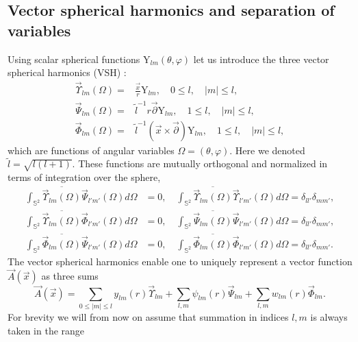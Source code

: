\documentclass[12pt]{article}
\newcommand{\pl}{\partial}
\newcommand{\Sph}{\mathbb{S}}
\newcommand{\YY}{\mathrm{Y}}
\begin{document}
\subsection{Vector spherical harmonics and separation
	    of variables}
	Using  scalar spherical functions
$ \YY_{lm}(\theta,\varphi) $
	let us introduce the three vector spherical harmonics (VSH)
\cite{VSH}:
\begin{align}
\label{VSH1}
    \vec{\Upsilon}_{lm}(\Omega) = & \frac{\vec{x}}{r} \YY_{lm} , \quad
        0 \leq l, \quad |m| \leq l, \\
    \vec{\Psi}_{lm}(\Omega) = & \tilde{l}^{-1} r \vec{\pl} \YY_{lm} , \quad
        1 \leq l , \quad |m| \leq l, \\
\label{VSH3}
    \vec{\Phi}_{lm}(\Omega)
	= & \tilde{l}^{-1} (\vec{x} \times \vec{\pl}) \YY_{lm},
        \quad 1 \leq l , \quad |m| \leq l ,
\end{align}
	which are functions of angular variables
$ \Omega = (\theta,\varphi) $.
	Here we denoted
$ \tilde{l} = \sqrt{l(l+1)} $.
	These functions are mutually orthogonal and normalized
    in terms of integration over the sphere,
\begin{align*}
    \int_{\Sph^{2}} \overline{\vec{\Upsilon}_{lm}(\Omega)}
        \vec{\Psi}_{l'm'}(\Omega) d\Omega & = 0 ,\quad
    \int_{\Sph^{2}} \overline{\vec{\Upsilon}_{lm}(\Omega)}
        \vec{\Upsilon}_{l'm'}(\Omega) d\Omega = \delta_{ll'} \delta_{mm'} , \\
    \int_{\Sph^{2}} \overline{\vec{\Upsilon}_{lm}(\Omega)}
        \vec{\Phi}_{l'm'}(\Omega) d\Omega       & = 0 ,\quad
    \int_{\Sph^{2}} \overline{\vec{\Psi}_{lm}(\Omega)}
        \vec{\Psi}_{l'm'}(\Omega) d\Omega = \delta_{ll'} \delta_{mm'} , \\
    \int_{\Sph^{2}} \overline{\vec{\Phi}_{lm}(\Omega)}
        \vec{\Psi}_{l'm'}(\Omega) d\Omega & = 0 ,\quad
    \int_{\Sph^{2}} \overline{\vec{\Phi}_{lm}(\Omega)}
        \vec{\Phi}_{l'm'}(\Omega) d\Omega = \delta_{ll'} \delta_{mm'} .
\end{align*}
	The vector spherical harmonics enable one to uniquely represent
	a vector function
$ \vec{A}(\vec{x}) $
	as three sums
\begin{equation}
\label{fext}
    \vec{A}(\vec{x}) =
        \sum_{0\leq |m| \leq l} y_{lm}(r) \vec{\Upsilon}_{lm} +
        \sum_{l,m} \psi_{lm}(r) \vec{\Psi}_{lm} +
        \sum_{l,m} w_{lm}(r) \vec{\Phi}_{lm} .
\end{equation}
	For brevity we will from now on assume that summation in indices
$ l,m $
	is always taken in the range
\end{document}
